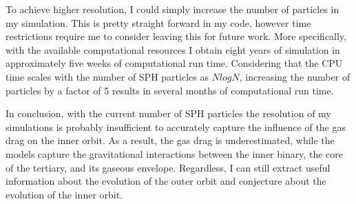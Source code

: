 To achieve higher resolution, I could simply increase the number of particles in my simulation. This is pretty straight forward in my code, however time restrictions require me to consider leaving this for future work. More specifically, with the available computational resources I obtain eight years of simulation in approximately five weeks of computational run time. Considering that the CPU time scales with the number of SPH particles as $NlogN$, increasing the number of particles by a factor of 5 results in several months of computational run time. 

In conclusion, with the current number of SPH particles the resolution of my simulations is probably insufficient to accurately capture the influence of the gas drag on the inner orbit. As a result, the gas drag is underestimated, while the models capture the gravitational interactions between the inner binary, the core of the tertiary, and its gaseous envelope. Regardless, I can still extract useful information about the evolution of the outer orbit and conjecture about the evolution of the inner orbit. 